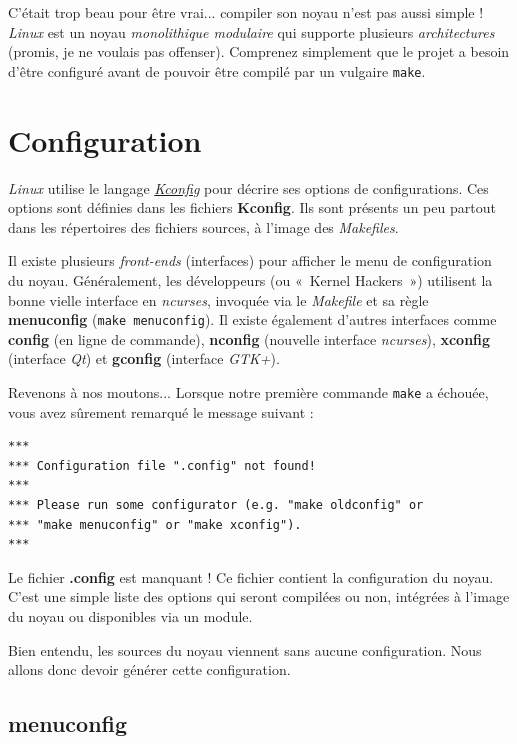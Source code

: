 \documentclass[a4paper]{article}
\begin{document}
C'était trop beau pour être vrai... compiler son noyau n'est pas aussi simple ! \textit{Linux} est un noyau \textit{monolithique modulaire} qui supporte plusieurs \textit{architectures} (promis, je ne voulais pas offenser). Comprenez simplement que le projet a besoin d'être configuré avant de pouvoir être compilé par un vulgaire \lstset{language=sh}\lstinline{make}.
\bigskip

\clearpage
\section{Configuration}

\textit{Linux} utilise le langage \textit{\href{https://www.kernel.org/doc/Documentation/kbuild/kconfig-language.txt}{Kconfig}} pour décrire ses options de configurations. Ces options sont définies dans les fichiers \textbf{Kconfig}. Ils sont présents un peu partout dans les répertoires des fichiers sources, à l'image des \textit{Makefiles}.
\bigskip

Il existe plusieurs \textit{front-ends} (interfaces) pour afficher le menu de configuration du noyau. Généralement, les développeurs (ou «~Kernel Hackers~») utilisent la bonne vielle interface en \textit{ncurses}, invoquée via le \textit{Makefile} et sa règle \textbf{menuconfig} (\lstset{language=sh}\lstinline{make menuconfig}). Il existe également d'autres interfaces comme \textbf{config} (en ligne de commande), \textbf{nconfig} (nouvelle interface \textit{ncurses}), \textbf{xconfig} (interface \textit{Qt}) et \textbf{gconfig} (interface \textit{GTK+}).
\bigskip

Revenons à nos moutons... Lorsque notre première commande \lstset{language=sh}\lstinline{make} a échouée, vous avez sûrement remarqué le message suivant :
\begin{lstlisting}[style=consoleOutputSyle]
***
*** Configuration file ".config" not found!
***
*** Please run some configurator (e.g. "make oldconfig" or
*** "make menuconfig" or "make xconfig").
***
\end{lstlisting}

Le fichier \textbf{.config} est manquant ! Ce fichier contient la configuration du noyau. C'est une simple liste des options qui seront compilées ou non, intégrées à l'image du noyau ou disponibles via un module.
\bigskip

Bien entendu, les sources du noyau viennent sans aucune configuration. Nous allons donc devoir générer cette configuration.
\bigskip

\subsection{menuconfig}
\end{document}
